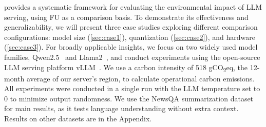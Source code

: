 \SYSTEM{} provides a systematic framework for evaluating the environmental impact of LLM serving, using FU as a comparison basis. To demonstrate its effectiveness and generalizability, we will present three case studies exploring different comparison configurations: model size (\cref{sec:case1}), quantization (\cref{sec:case2}), and hardware (\cref{sec:case3}). For broadly applicable insights, we focus on two widely used model families, Qwen2.5~\cite{qwen2025qwen25technicalreport} and Llama2~\cite{touvron2023llama2openfoundation}, and conduct experiments using the open-source LLM serving platform vLLM~\cite{kwon2023efficient}. We use a carbon intensity of 518 gCO\textsubscript{2}eq, the 12-month average of our server's region, to calculate operational carbon emissions. All experiments were conducted in a single run with the LLM temperature set to 0 to minimize output randomness. We use the NewsQA \cite{trischler2016newsqa} summarization dataset for main results, as it tests language understanding without extra context. Results on other datasets are in the Appendix.





